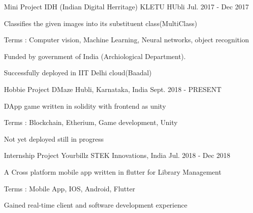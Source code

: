


\begin{cventries}


\cventry
{Mini Project} %
{IDH (Indian Digital Herritage)} %
{KLETU HUbli} %
{Jul. 2017 - Dec 2017} %
{ %
\begin{cvitems}
\item {Classifies the given images into its substituent class(MultiClass)}
\item {Terms : Computer vision, Machine Learning, Neural networks, object recognition}
\item {Funded by government of India  (Archiological Department).}
\item{Successfully deployed in IIT Delhi cloud(Baadal)}
\end{cvitems}
}


\cventry
{Hobbie Project} %
{DMaze} %
{Hubli, Karnataka, India} %
{Sept. 2018 - PRESENT} %
{ %
\begin{cvitems}
\item {DApp game written in solidity with frontend as unity}
\item {Terms : Blockchain, Etherium, Game development, Unity}
\item {Not yet deployed still in progress}
\end{cvitems}
}


\cventry
{Internship Project} %
{Yourbillz} %
{STEK Innovations, India} %
{Jul. 2018 - Dec 2018} %
{ %
\begin{cvitems}
\item {A Cross platform mobile app written in flutter for Library Management}
\item {Terms : Mobile App, IOS, Android, Flutter}
\item {Gained real-time client and software development experience}
\end{cvitems}
}


\end{cventries}
